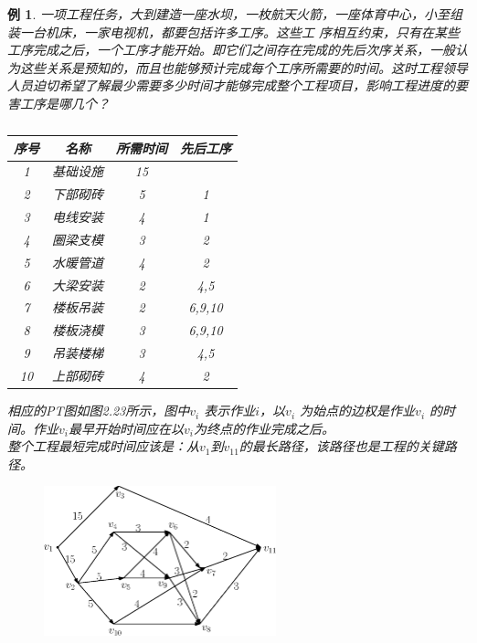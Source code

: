 \documentclass[11pt,a4paper,openany]{book}
\newtheorem{sample}{\textbf{例}}[section]
\begin{document}
\begin{sample}\K
一项工程任务，大到建造一座水坝，一枚航天火箭，一座体育中心，小至组装一台机床，一家电视机，都要包括许多工序。这些工
序相互约束，只有在某些工序完成之后，一个工序才能开始。即它们之间存在完成的先后次序关系，一般认为这些关系是预知的，而且也能够预计完成每个工序所需要的时间。这时工程领导人员迫切希望了解最少需要多少时间才能够完成整个工程项目，影响工程进度的要害工序是哪几个？\\
\begin{table}[!ht]
  \centering
  \begin{tabular}{|c|c|c|c|}
\hline
  序号 &  名称 &  所需时间 & 先后工序  \\
\hline
 1 &  基础设施  &  15 &  \\
\hline
 2 & 下部砌砖 &  5 &  1 \\
\hline
 3 & 电线安装 &  4 &  1\\
\hline
 4 &   圈梁支模&   3&  2\\
\hline
 5 &  水暖管道 &   4&  2\\
\hline
6 &  大梁安装 &  2 &  4,5 \\
\hline
 7 &   楼板吊装&   2&  6,9,10\\
\hline
 8 &  楼板浇模 &  3 &  6,9,10\\
\hline
 9 &  吊装楼梯 & 3 &  4,5\\
\hline
 10 &  上部砌砖 &   4&  2 \\
\hline
\end{tabular}
  \caption{}
\end{table}
相应的PT图如图2.23所示，图中$v_i$ 表示作业$i$，以$v_i$ 为始点的边权是作业$v_i$ 的时间。作业$v_i$最早开始时间应在以$v_i$为终点的作业完成之后。\\
整个工程最短完成时间应该是：从$v_1$到$v_11$的最长路径，该路径也是工程的关键路径。
\begin{figure}[H]
  \centering
  \includegraphics[width=0.6\textwidth]{2_23.eps}\\
  \caption{}
\end{figure}
\end{sample}
\end{document}
